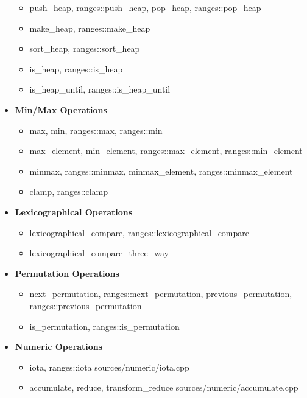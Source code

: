 \documentclass{article}
\begin{document}
\begin{itemize}
          \begin{itemize}
            \item push\_heap, ranges::push\_heap, pop\_heap, ranges::pop\_heap
            \item make\_heap, ranges::make\_heap
            \item sort\_heap, ranges::sort\_heap
            \item is\_heap, ranges::is\_heap
            \item is\_heap\_until, ranges::is\_heap\_until
          \end{itemize}
        \item \textbf{Min/Max Operations}
          \begin{itemize}
            \item max, min, ranges::max, ranges::min
            \item max\_element, min\_element, ranges::max\_element, ranges::min\_element
            \item minmax, ranges::minmax, minmax\_element, ranges::minmax\_element
            \item clamp, ranges::clamp
          \end{itemize}
        \item \textbf{Lexicographical Operations}
          \begin{itemize}
            \item lexicographical\_compare, ranges::lexicographical\_compare
            \item lexicographical\_compare\_three\_way
          \end{itemize}
        \item \textbf{Permutation Operations}
          \begin{itemize}
            \item next\_permutation, ranges::next\_permutation, previous\_permutation, ranges::previous\_permutation
            \item is\_permutation, ranges::is\_permutation
          \end{itemize}
        \item \textbf{Numeric Operations}
          \begin{itemize}
            \item iota, ranges::iota
               {sources/numeric/iota.cpp}
            \item accumulate, reduce, transform\_reduce
               {sources/numeric/accumulate.cpp}

\end{itemize}
\end{itemize}
\end{document}
